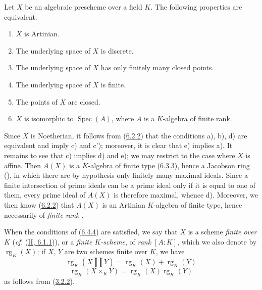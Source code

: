 \begin{proposition}[6.4.4]
\label{I.6.4.4}
Let $X$ be an algebraic prescheme over a field $K$. The following properties
are equivalent:
\begin{enumerate}
  \item[\rm(a)] $X$ is Artinian.
  \item[\rm(b)] The underlying space of $X$ is discrete.
  \item[\rm(c)] The underlying space of $X$ has only finitely many closed
    points.
  \item[\rm(c')] The underlying space of $X$ is finite.
  \item[\rm(d)] The points of $X$ are closed.
  \item[\rm(e)] $X$ is isomorphic to $\operatorname{Spec}(A)$, where $A$ is a
    $K$-algebra of finite rank.
\end{enumerate}
\end{proposition}

Since $X$ is Noetherian, it follows from (\hyperref[I.6.2.2]{6.2.2}) that
the conditions a), b), d) are equivalent and imply c) and c'); moreover,
it is clear that e) implies a). It remains to see that c) implies d) and
e); we may restrict to the case where $X$ is affine. Then $A(X)$ is a
$K$-algebra of finite type (\hyperref[I.6.3.3]{6.3.3}), hence a Jacobson
ring (\cite[p.~3-11 and 3-12]{I-1}), in which there are by hypothesis
only finitely many maximal ideals. Since a finite intersection of prime
ideals can be a prime ideal only if it is equal to one of them,
every prime ideal of $A(X)$ is therefore maximal, whence d). Moreover, we
then know (\hyperref[I.6.2.2]{6.2.2}) that $A(X)$ is an Artinian
$K$-algebra of finite type, hence necessarily of \emph{finite rank}
\cite{I-21}.

\begin{env}[6.4.5]
\label{I.6.4.5}
When the conditions of (\hyperref[I.6.4.4]{6.4.4}) are satisfied,
we say that $X$ is a scheme \emph{finite over $K$}
(\emph{cf.} (\hyperref[II.6.1.1]{II, 6.1.1})), or a
\emph{finite $K$-scheme}, of \emph{rank} $[A:K]$, which we also denote by
$\operatorname{rg}_K(X)$; if $X$, $Y$ are two schemes finite over $K$, we
have
\[
  \operatorname{rg}_K(X\amalg Y)
  =\operatorname{rg}_K(X)+\operatorname{rg}_K(Y)
  \tag{6.4.5.1}\label{I.6.4.5.1}
\]
\[
  \operatorname{rg}_K(X\times_K Y)
  =\operatorname{rg}_K(X)\operatorname{rg}_K(Y)
  \tag{6.4.5.2}\label{I.6.4.5.2}
\]
as follows from (\hyperref[I.3.2.2]{3.2.2}).
\end{env}


